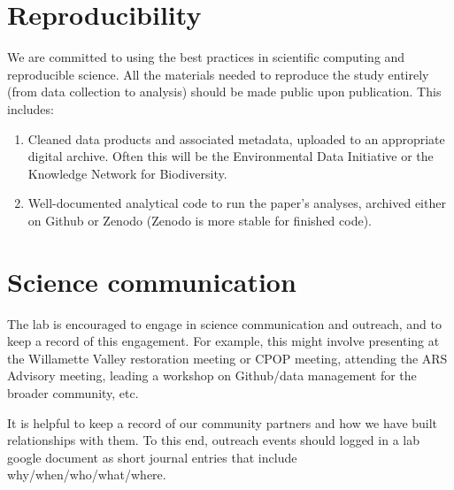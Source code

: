 \documentclass[12pt]{article}
\begin{document}
\section{Reproducibility}
We are committed to using the best practices in scientific computing
and reproducible science. All the
materials needed to reproduce the study entirely (from data collection
to analysis) should be made public upon publication. This includes:
\begin{enumerate}
\item Cleaned data products and associated metadata, uploaded to an appropriate digital archive. Often this will be the Environmental Data Initiative or the Knowledge Network for Biodiversity.
\item Well-documented analytical code to run the  paper's analyses, archived either on Github or Zenodo (Zenodo is more stable for finished code).
\end{enumerate}


\section{Science communication}
The lab is encouraged to engage in science communication and outreach, and to keep a record of this engagement. For example, this might involve presenting at the Willamette Valley restoration meeting or CPOP meeting, attending the ARS Advisory meeting, leading a workshop on Github/data management for the broader community, etc. 

It is helpful to keep a record of our community partners and how we have built relationships with them. To this end, outreach events should logged in a lab google document as short journal entries that include why/when/who/what/where.
\end{document}
